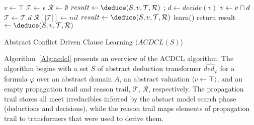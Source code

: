 %
\begin{algorithm2e}[t]
\DontPrintSemicolon
{}
\begin{small}
$v \leftarrow \top$ \;
$\mathcal{T} \leftarrow \epsilon$ \;
$\mathcal{R} \leftarrow \emptyset$ \;
$result \leftarrow \deduce(S,v,\mathcal{T},\mathcal{R})$ \;
 {
  \return \safe \;
}
{
   {
    \return \unsafe;
  }
  $d \leftarrow decide(v)$ \;
  $v \leftarrow v \sqcap d$ \; 
  $\mathcal{T} \leftarrow \mathcal{T} . d$ \; 
  $\mathcal{R}[|\mathcal{T}|] \leftarrow nil$ \;
  $result \leftarrow \deduce(S,v,\mathcal{T},\mathcal{R})$\;
   {
    learn() \;
     {
      return \safe \;  
    }
    result $\leftarrow \deduce(S,v,\mathcal{T},\mathcal{R})$ \;
  }
}
\end{small}
\caption{Abstract Conflict Driven Clause Learning $\langle ACDCL(S) \rangle$ \label{Alg:acdcl}}
\end{algorithm2e}
%
Algorithm~\ref{Alg:acdcl} presents an overview of the ACDCL algorithm.
The algorithm begins with a set $S$ of abstract deduction transformer 
$\widehat{ded_{\varphi}}$ for a formula $\varphi$ over an abstract 
domain $A$, an abstract valuation $\langle v \leftarrow \top \rangle$, 
and an empty propagation trail and reason trail, $\mathcal{T}$, $\mathcal{R}$, 
respectively.  The propagation trail stores all meet irreducibles inferred 
by the abstact model search phase (deductions and decisions), while the 
reason trail maps elements of propagation trail to transformers that were 
used to derive them.  

